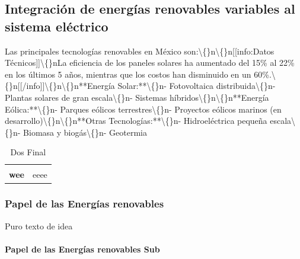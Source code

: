 \documentclass{sener2025}
\begin{document}
\subsection{Integración de energías renovables variables al sistema eléctrico}

Las principales tecnologías renovables en México son:\textbackslash\{\}n\textbackslash\{\}n[[info:Datos Técnicos]]\textbackslash\{\}nLa eficiencia de los paneles solares ha aumentado del 15\% al 22\% en los últimos 5 años, mientras que los costos han disminuido en un 60\%.\textbackslash\{\}n[[/info]]\textbackslash\{\}n\textbackslash\{\}n**Energía Solar:**\textbackslash\{\}n- Fotovoltaica distribuida\textbackslash\{\}n- Plantas solares de gran escala\textbackslash\{\}n- Sistemas híbridos\textbackslash\{\}n\textbackslash\{\}n**Energía Eólica:**\textbackslash\{\}n- Parques eólicos terrestres\textbackslash\{\}n- Proyectos eólicos marinos (en desarrollo)\textbackslash\{\}n\textbackslash\{\}n**Otras Tecnologías:**\textbackslash\{\}n- Hidroeléctrica pequeña escala\textbackslash\{\}n- Biomasa y biogás\textbackslash\{\}n- Geotermia \cite{geo2024_potencial}
\begin{tabladorado}
  \begin{longtable}{B{3cm}p{2cm}}
    \caption{Dos Final}\label{tab:dos_final}\\
    \toprule
      &  \\
    \midrule
    \endfirsthead

      &  \\
    \midrule
    \endhead

    \bottomrule
    \endlastfoot

    \textbf{wee} & eeee \\
  \end{longtable}
\end{tabladorado}



\subsubsection{Papel de las Energías renovables}

Puro texto de idea


\paragraph{Papel de las Energías renovables Sub}
\end{document}
